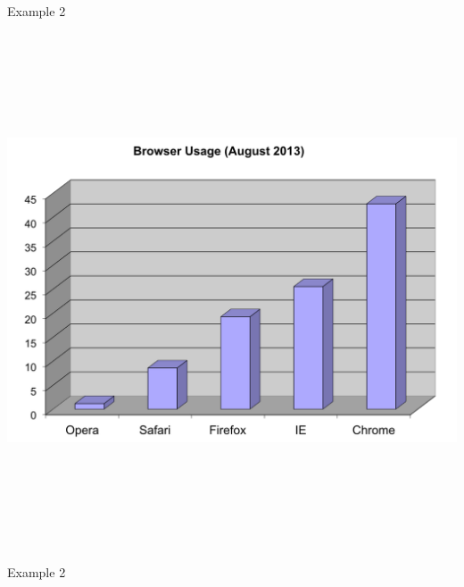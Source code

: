 \documentclass[12pt]{article}
\newcommand{\headsize}{\fontsize{35}{35} \selectfont}
\begin{document}
\newpage


\headsize \color{yellow}
\hfill \begin{minipage}{5.75in}
\centering
Example 2
\end{minipage}

\vspace{30mm}

\centerline{\includegraphics[height=6in]{Figs/fig2b.png}}



\newpage


\headsize \color{yellow}
\hfill \begin{minipage}{5.75in}
\centering
Example 2
\end{minipage}

\vspace{30mm}
\end{document}
